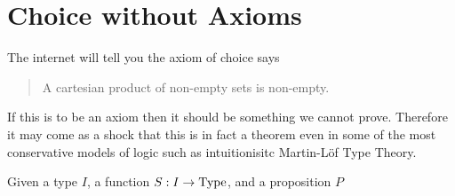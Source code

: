 
\chapter{Choice without Axioms}

The internet will tell you the axiom of choice says
\begin{quote}
    A cartesian product of non-empty sets is non-empty.
\end{quote}
If this is to be an axiom then it should be something we cannot prove.
Therefore it may come as a shock that this is in fact a theorem even 
in some of the most conservative models of logic such as intuitionisitc 
Martin-L\"of Type Theory.

\begin{theorem}
    Given a type $I$, a function $S:I\to \operatorname{Type}$, and a proposition $P$
    
\end{theorem}